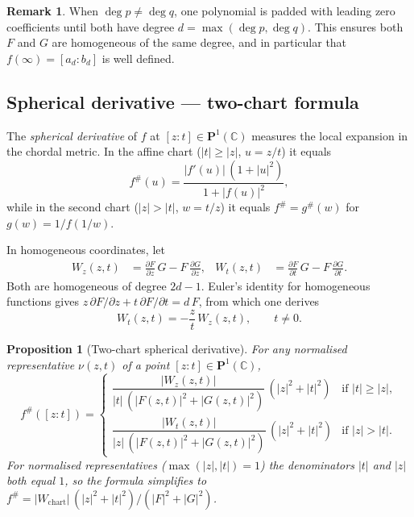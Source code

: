 \documentclass[12pt]{article}
\newtheorem{proposition}[theorem]{Proposition}
\theoremstyle{definition}
\newtheorem{remark}[theorem]{Remark}
\newcommand{\C}{\mathbb{C}}
\newcommand{\Pone}{\mathbf{P}^1(\C)}
\newcommand{\fsh}{f^{\#}}
\begin{document}
\begin{remark}
When $\deg p\neq\deg q$, one polynomial is padded with leading zero
coefficients until both have degree $d=\max(\deg p,\deg q)$.
This ensures both $F$ and $G$ are homogeneous of the same degree, and in
particular that $f(\infty)=[a_d:b_d]$ is well defined.
\end{remark}

\subsection{Spherical derivative --- two-chart formula}
\label{subsec:sphderiv}

The \emph{spherical derivative} of $f$ at $[z:t]\in\Pone$ measures the
local expansion in the chordal metric.  In the affine chart ($|t|\geq|z|$,
$u=z/t$) it equals
\begin{equation}\label{eq:sphderiv_affine}
  \fsh(u) = \frac{|f'(u)|\,(1+|u|^2)}{1+|f(u)|^2},
\end{equation}
while in the second chart ($|z|>|t|$, $w=t/z$) it equals
$\fsh = g^{\#}(w)$ for $g(w)=1/f(1/w)$.

In homogeneous coordinates, let
\begin{align*}
  W_z(z,t) &= \frac{\partial F}{\partial z}\,G - F\,\frac{\partial G}{\partial z},
  &
  W_t(z,t) &= \frac{\partial F}{\partial t}\,G - F\,\frac{\partial G}{\partial t}.
\end{align*}
Both are homogeneous of degree $2d-1$.  Euler's identity for homogeneous
functions gives $z\,\partial F/\partial z + t\,\partial F/\partial t = d\,F$,
from which one derives
\begin{equation}\label{eq:Wrel}
  W_t(z,t) = -\frac{z}{t}\,W_z(z,t), \qquad t\neq 0.
\end{equation}

\begin{proposition}[Two-chart spherical derivative]\label{prop:sphderiv}
For any normalised representative $\nu(z,t)$ of a point
$[z:t]\in\Pone$,
\begin{equation}\label{eq:sphderiv_hom}
  \fsh([z:t]) =
  \begin{cases}
    \dfrac{|W_z(z,t)|}{|t|\,(|F(z,t)|^2+|G(z,t)|^2)}\,(|z|^2+|t|^2)
      & \text{if }|t|\geq|z|, \\[10pt]
    \dfrac{|W_t(z,t)|}{|z|\,(|F(z,t)|^2+|G(z,t)|^2)}\,(|z|^2+|t|^2)
      & \text{if }|z|>|t|.
  \end{cases}
\end{equation}
For normalised representatives ($\max(|z|,|t|)=1$) the denominators
$|t|$ and $|z|$ both equal $1$, so the formula simplifies to
$\fsh = |W_{\mathrm{chart}}|\,(|z|^2+|t|^2)/(|F|^2+|G|^2)$.
\end{proposition}
\end{document}
